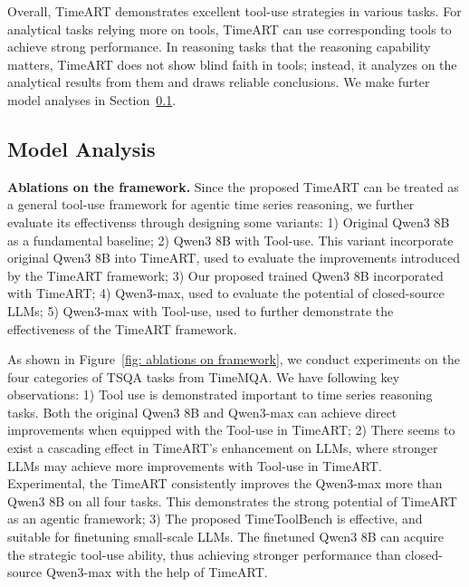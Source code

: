 Overall, TimeART demonstrates excellent tool-use strategies in various tasks. For analytical tasks relying more on tools, TimeART can use corresponding tools to achieve strong performance. In reasoning tasks that the reasoning capability matters, TimeART does not show blind faith in tools; instead, it analyzes on the analytical results from them and draws reliable conclusions. We make furter model analyses in Section~\ref{sec: model analysis}.

\subsection{Model Analysis}
\label{sec: model analysis}

\textbf{Ablations on the framework.} Since the proposed TimeART can be treated as a general tool-use framework for agentic time series reasoning, we further evaluate its effectivenss through designing some variants: 1) Original Qwen3 8B as a fundamental baseline; 2) Qwen3 8B with Tool-use. This variant incorporate original Qwen3 8B into TimeART, used to evaluate the improvements introduced by the TimeART framework; 3) Our proposed trained Qwen3 8B incorporated with TimeART; 4) Qwen3-max, used to evaluate the potential of closed-source LLMs; 5) Qwen3-max with Tool-use, used to further demonstrate the effectiveness of the TimeART framework. 

As shown in Figure~\ref{fig: ablations on framework}, we conduct experiments on the four categories of TSQA tasks from TimeMQA. We have following key observations: 1) Tool use is demonstrated important to time series reasoning tasks. Both the original Qwen3 8B and Qwen3-max can achieve direct improvements when equipped with the Tool-use in TimeART; 2) There seems to exist a cascading effect in TimeART's enhancement on LLMs, where stronger LLMs may achieve more improvements with Tool-use in TimeART. Experimental, the TimeART consistently improves the Qwen3-max more than Qwen3 8B  on all four tasks. This demonstrates the strong potential of TimeART as an agentic framework; 3) The proposed TimeToolBench is effective, and suitable for finetuning small-scale LLMs. The finetuned Qwen3 8B can acquire the strategic tool-use ability, thus achieving stronger performance than closed-source Qwen3-max with the help of TimeART.

